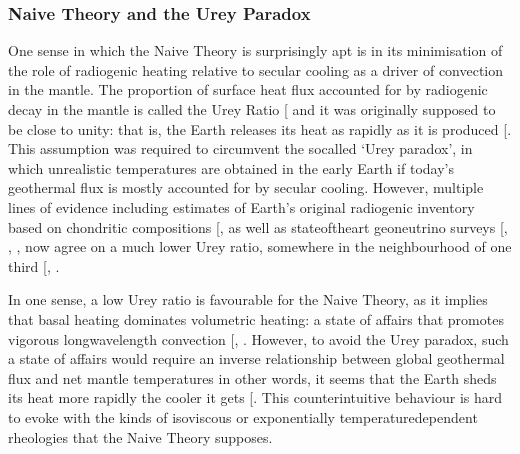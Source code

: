 \documentclass[letterpaper,10pt,english]{jupyterBook}
\begin{document}
\subsubsection{Naive Theory and the Urey Paradox}
\label{\detokenize{content/chapter_01_background/main:naive-theory-and-the-urey-paradox}}
\sphinxAtStartPar
One sense in which the Naive Theory is surprisingly apt is in its minimisation of the role of radiogenic heating relative to secular cooling as a driver of convection in the mantle. The proportion of surface heat flux accounted for by radiogenic decay in the mantle is called the Urey Ratio {[}\sphinxcite{references:id88}{]} and it was originally supposed to be close to unity: that is, the Earth releases its heat as rapidly as it is produced {[}\sphinxcite{references:id399}{]}. This assumption was required to circumvent the so\sphinxhyphen{}called ‘Urey paradox’, in which unrealistic temperatures are obtained in the early Earth if today’s geothermal flux is mostly accounted for by secular cooling. However, multiple lines of evidence \sphinxhyphen{} including estimates of Earth’s original radiogenic inventory based on chondritic compositions {[}\sphinxcite{references:id457}{]}, as well as state\sphinxhyphen{}of\sphinxhyphen{}the\sphinxhyphen{}art geoneutrino surveys {[}, , , \sphinxcite{references:id401}{]} \sphinxhyphen{} now agree on a much lower Urey ratio, somewhere in the neighbourhood of one third {[}, \sphinxcite{references:id401}{]}.

\sphinxAtStartPar
In one sense, a low Urey ratio is favourable for the Naive Theory, as it implies that basal heating dominates volumetric heating: a state of affairs that promotes vigorous long\sphinxhyphen{}wavelength convection {[}, \sphinxcite{references:id339}{]}. However, to avoid the Urey paradox, such a state of affairs would require an inverse relationship between global geothermal flux and net mantle temperatures \sphinxhyphen{} in other words, it seems that the Earth sheds its heat more rapidly the cooler it gets {[}\sphinxcite{references:id457}{]}. This counter\sphinxhyphen{}intuitive behaviour is hard to evoke with the kinds of isoviscous or exponentially temperature\sphinxhyphen{}dependent rheologies that the Naive Theory supposes.
\end{document}
